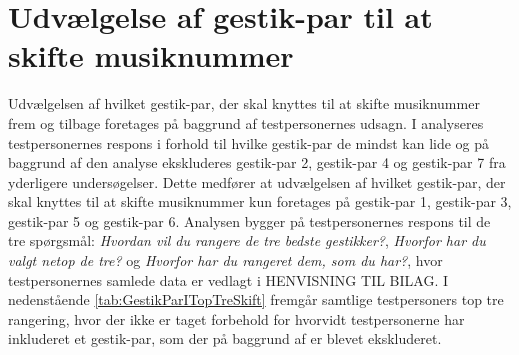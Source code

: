 \section{Udvælgelse af gestik-par til at skifte musiknummer}
\label{TestresultaterSkiftMusiknummer}
%
Udvælgelsen af hvilket gestik-par, der skal knyttes til at skifte musiknummer frem og tilbage foretages på baggrund af testpersonernes udsagn. I  analyseres testpersonernes respons i forhold til hvilke gestik-par de mindst kan lide og på baggrund af den analyse ekskluderes gestik-par 2, gestik-par 4 og gestik-par 7 fra yderligere undersøgelser. Dette medfører at udvælgelsen af hvilket gestik-par, der skal knyttes til at skifte musiknummer kun foretages på gestik-par 1, gestik-par 3, gestik-par 5 og gestik-par 6. Analysen bygger på testpersonernes respons til de tre spørgsmål: \textit{Hvordan vil du rangere de tre bedste gestikker?}, \textit{Hvorfor har du valgt netop de tre?} og \textit{Hvorfor har du rangeret dem, som du har?}, hvor testpersonernes samlede data er vedlagt i HENVISNING TIL BILAG.  \blankline
%  
I nedenstående \autoref{tab:GestikParITopTreSkift} fremgår samtlige testpersoners top tre rangering, hvor der ikke er taget forbehold for hvorvidt testpersonerne har inkluderet et gestik-par, som der på baggrund af  er blevet ekskluderet.
%
